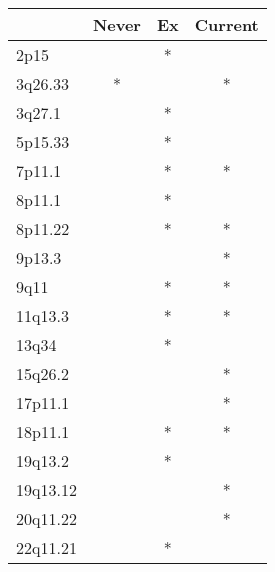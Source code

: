 \begin{tabular}{lccc}
\toprule
{} & Never & Ex & Current \\
\midrule
2p15     &       &  * &         \\
3q26.33  &     * &    &       * \\
3q27.1   &       &  * &         \\
5p15.33  &       &  * &         \\
7p11.1   &       &  * &       * \\
8p11.1   &       &  * &         \\
8p11.22  &       &  * &       * \\
9p13.3   &       &    &       * \\
9q11     &       &  * &       * \\
11q13.3  &       &  * &       * \\
13q34    &       &  * &         \\
15q26.2  &       &    &       * \\
17p11.1  &       &    &       * \\
18p11.1  &       &  * &       * \\
19q13.2  &       &  * &         \\
19q13.12 &       &    &       * \\
20q11.22 &       &    &       * \\
22q11.21 &       &  * &         \\
\bottomrule
\end{tabular}
